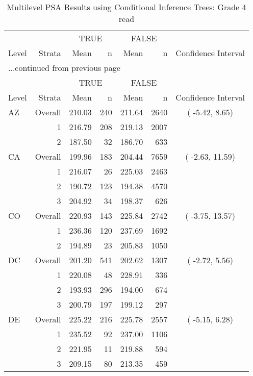 \begin{longtable}{lrrr@{\extracolsep{.25cm}}rrc}
\caption{Multilevel PSA Results using Conditional Inference Trees: Grade 4 read} \\ 
   \hline & & \multicolumn{2}{c}{TRUE} & \multicolumn{2}{c}{FALSE} & \\ \cline{3-4} \cline{5-6} Level & Strata & Mean & n & Mean & n & Confidence Interval \\ \hline\endfirsthead \multicolumn{7}{l}{{...continued from previous page}}\\ \hline  & & \multicolumn{2}{c}{TRUE} & \multicolumn{2}{c}{FALSE} & \\ \cline{3-4} \cline{5-6} Level & Strata & Mean & n & Mean & n & Confidence Interval \\ \hline \endhead \endfoot \endlastfoot  \hline
AZ & Overall & 210.03 & 240 & 211.64 & 2640 & ( -5.42,  8.65) \\ 
   & 1 & 216.79 & 208 & 219.13 & 2007 &  \\ 
   & 2 & 187.50 &  32 & 186.70 & 633 &  \\ 
   \hline
CA & Overall & 199.96 & 183 & 204.44 & 7659 & ( -2.63, 11.59) \\ 
   & 1 & 216.07 &  26 & 225.03 & 2463 &  \\ 
   & 2 & 190.72 & 123 & 194.38 & 4570 &  \\ 
   & 3 & 204.92 &  34 & 198.37 & 626 &  \\ 
   \hline
CO & Overall & 220.93 & 143 & 225.84 & 2742 & ( -3.75, 13.57) \\ 
   & 1 & 236.36 & 120 & 237.69 & 1692 &  \\ 
   & 2 & 194.89 &  23 & 205.83 & 1050 &  \\ 
   \hline
DC & Overall & 201.20 & 541 & 202.62 & 1307 & ( -2.72,  5.56) \\ 
   & 1 & 220.08 &  48 & 228.91 & 336 &  \\ 
   & 2 & 193.93 & 296 & 194.00 & 674 &  \\ 
   & 3 & 200.79 & 197 & 199.12 & 297 &  \\ 
   \hline
DE & Overall & 225.22 & 216 & 225.78 & 2557 & ( -5.15,  6.28) \\ 
   & 1 & 235.52 &  92 & 237.00 & 1106 &  \\ 
   & 2 & 221.95 &  11 & 219.88 & 594 &  \\ 
   & 3 & 209.15 &  80 & 213.35 & 459 &  \\ 

\end{longtable}
